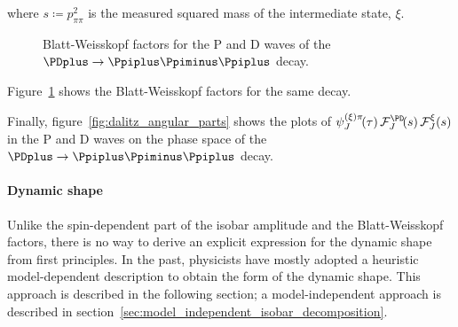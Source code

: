     where $s \coloneqq p_{\pi\pi}^2$ is the measured squared mass of the intermediate state, $\xi$.
    \begin{figure}
        \centering
        \subfloat[][P wave.]{}

        \subfloat[][D wave.]{}

        \caption{Blatt-Weisskopf factors for the P and D waves of the $\PDplus\to\Ppiplus\Ppiminus\Ppiplus$ decay.}
        \label{fig:blatt_weisskopf}
    \end{figure}
    Figure~\ref{fig:blatt_weisskopf} shows the Blatt-Weisskopf factors for the same decay.


    Finally, figure~\ref{fig:dalitz_angular_parts} shows the plots of $\psi_J^{(\xi)\pi}\!(\tau)\,\mathcal{F}_J^{\PD}\!(s)\,\mathcal{F}_J^{\xi}(s)$ in the P and D waves on the phase space of the $\PDplus\to\Ppiplus\Ppiminus\Ppiplus$ decay.

    \paragraph{Dynamic shape}
    Unlike the spin-dependent part of the isobar amplitude and the Blatt-Weisskopf factors, there is no way to derive an explicit expression for the dynamic shape from first principles.
    In the past, physicists have mostly adopted a heuristic model-dependent description to obtain the form of the dynamic shape.
    This approach is described in the following section; a model-independent approach is described in section~\ref{sec:model_independent_isobar_decomposition}.


    
    
